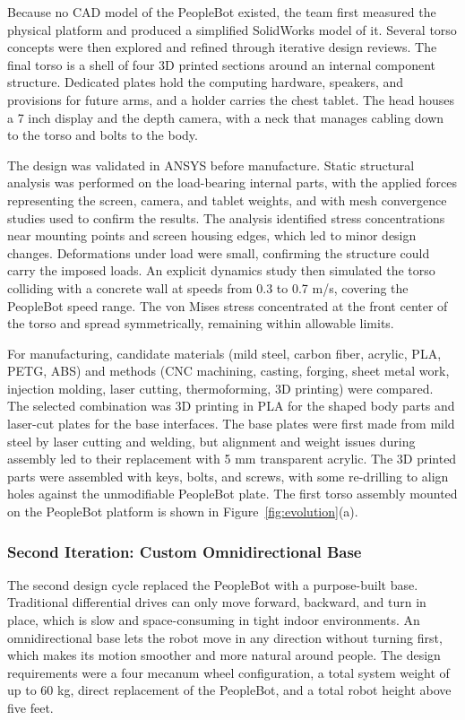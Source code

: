 \documentclass[11pt,a4paper]{article}
\begin{document}
Because no CAD model of the PeopleBot existed, the team first measured the physical platform and produced a simplified SolidWorks model of it. Several torso concepts were then explored and refined through iterative design reviews. The final torso is a shell of four 3D printed sections around an internal component structure. Dedicated plates hold the computing hardware, speakers, and provisions for future arms, and a holder carries the chest tablet. The head houses a 7 inch display and the depth camera, with a neck that manages cabling down to the torso and bolts to the body.

The design was validated in ANSYS before manufacture. Static structural analysis was performed on the load-bearing internal parts, with the applied forces representing the screen, camera, and tablet weights, and with mesh convergence studies used to confirm the results. The analysis identified stress concentrations near mounting points and screen housing edges, which led to minor design changes. Deformations under load were small, confirming the structure could carry the imposed loads. An explicit dynamics study then simulated the torso colliding with a concrete wall at speeds from 0.3 to 0.7 m/s, covering the PeopleBot speed range. The von Mises stress concentrated at the front center of the torso and spread symmetrically, remaining within allowable limits.

For manufacturing, candidate materials (mild steel, carbon fiber, acrylic, PLA, PETG, ABS) and methods (CNC machining, casting, forging, sheet metal work, injection molding, laser cutting, thermoforming, 3D printing) were compared. The selected combination was 3D printing in PLA for the shaped body parts and laser-cut plates for the base interfaces. The base plates were first made from mild steel by laser cutting and welding, but alignment and weight issues during assembly led to their replacement with 5 mm transparent acrylic. The 3D printed parts were assembled with keys, bolts, and screws, with some re-drilling to align holes against the unmodifiable PeopleBot plate. The first torso assembly mounted on the PeopleBot platform is shown in Figure~\ref{fig:evolution}(a).

\subsubsection{Second Iteration: Custom Omnidirectional Base}

The second design cycle replaced the PeopleBot with a purpose-built base. Traditional differential drives can only move forward, backward, and turn in place, which is slow and space-consuming in tight indoor environments. An omnidirectional base lets the robot move in any direction without turning first, which makes its motion smoother and more natural around people. The design requirements were a four mecanum wheel configuration, a total system weight of up to 60 kg, direct replacement of the PeopleBot, and a total robot height above five feet.
\end{document}
